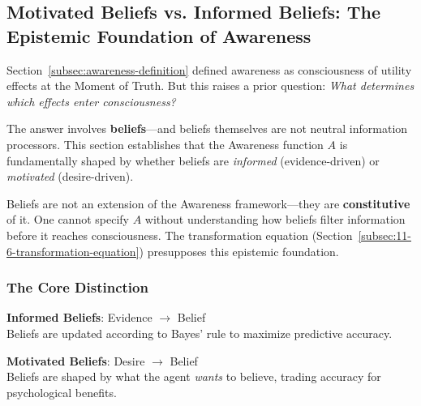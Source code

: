 \subsection{Motivated Beliefs vs. Informed Beliefs: The Epistemic Foundation of Awareness}
\label{subsec:11-3-motivated-beliefs}


Section~\ref{subsec:awareness-definition} defined awareness as consciousness 
of utility effects at the Moment of Truth. But this raises a prior question: 
\emph{What determines which effects enter consciousness?} 

The answer involves \textbf{beliefs}---and beliefs themselves are not neutral 
information processors. This section establishes that the Awareness function 
$A$ is fundamentally shaped by whether beliefs are \emph{informed} (evidence-driven) 
or \emph{motivated} (desire-driven).

\begin{tcolorbox}[colback=red!5!white, colframe=red!75!black, title=Why This Section Comes Early]
Beliefs are not an extension of the Awareness framework---they are 
\textbf{constitutive} of it. One cannot specify $A$ without understanding 
how beliefs filter information before it reaches consciousness. The 
transformation equation (Section~\ref{subsec:11-6-transformation-equation}) 
presupposes this epistemic foundation.
\end{tcolorbox}

\subsubsection{The Core Distinction}
\label{subsubsec:core-distinction}

\begin{tcolorbox}[colback=blue!5!white, colframe=blue!75!black, title=Two Modes of Belief Formation]
\textbf{Informed Beliefs}: Evidence $\rightarrow$ Belief \\
Beliefs are updated according to Bayes' rule to maximize predictive accuracy.

\textbf{Motivated Beliefs}: Desire $\rightarrow$ Belief \\
Beliefs are shaped by what the agent \emph{wants} to believe, trading accuracy 
for psychological benefits.
\end{tcolorbox}

